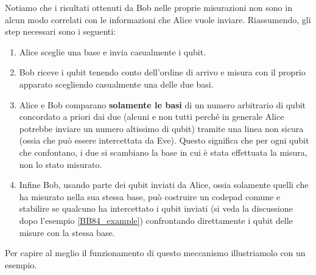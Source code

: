 \noindent Notiamo che i risultati ottenuti da Bob nelle proprie misurazioni non sono in alcun modo correlati con le informazioni che Alice vuole inviare. Riassumendo, gli step necessari sono i seguenti:
\begin{enumerate}
    \item Alice sceglie una base e invia casualmente i qubit.
    
    \item Bob riceve i qubit tenendo conto dell'ordine di arrivo e misura con il proprio apparato scegliendo casualmente una delle due basi. 
    
    \item Alice e Bob comparano \textbf{solamente le basi} di un numero arbitrario di qubit concordato a priori dai due (alcuni e non tutti perché in generale Alice potrebbe inviare un numero altissimo di qubit) tramite una linea non sicura (ossia che può essere intercettata da Eve). Questo significa che per ogni qubit che confontano, i due si scambiano la base in cui è stata effettuata la misura, non lo stato misurato.
    
    \item Infine Bob, usando parte dei qubit inviati da Alice, ossia solamente quelli che ha misurato nella sua stessa base, può costruire un codepad comune e stabilire se qualcuno ha intercettato i qubit inviati (si veda la discussione dopo l'esempio \ref{BB84_example}) confrontando direttamente i qubit delle misure con la stessa base. 
\end{enumerate}

\noindent Per capire al meglio il funzionamento di questo meccanismo illustriamolo con un esempio.

